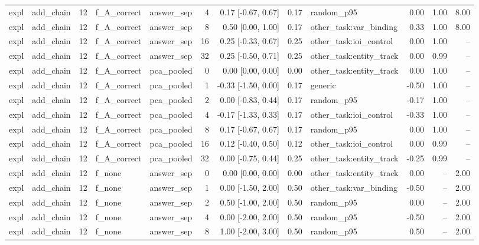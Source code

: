 \begin{tabular}{llrllrrrlrrr}
expl & add\_chain & 12 & f\_A\_correct & answer\_sep & 4 & 0.17 [-0.67, 0.67] & 0.17 & random\_p95 & 0.00 & 1.00 & 8.00 \\
expl & add\_chain & 12 & f\_A\_correct & answer\_sep & 8 & 0.50 [0.00, 1.00] & 0.17 & other\_task:var\_binding & 0.33 & 1.00 & 8.00 \\
expl & add\_chain & 12 & f\_A\_correct & answer\_sep & 16 & 0.25 [-0.33, 0.67] & 0.25 & other\_task:ioi\_control & 0.00 & 1.00 & -- \\
expl & add\_chain & 12 & f\_A\_correct & answer\_sep & 32 & 0.25 [-0.50, 0.71] & 0.25 & other\_task:entity\_track & 0.00 & 0.99 & -- \\
expl & add\_chain & 12 & f\_A\_correct & pca\_pooled & 0 & 0.00 [0.00, 0.00] & 0.00 & other\_task:entity\_track & 0.00 & 1.00 & -- \\
expl & add\_chain & 12 & f\_A\_correct & pca\_pooled & 1 & -0.33 [-1.50, 0.00] & 0.17 & generic & -0.50 & 1.00 & -- \\
expl & add\_chain & 12 & f\_A\_correct & pca\_pooled & 2 & 0.00 [-0.83, 0.44] & 0.17 & random\_p95 & -0.17 & 1.00 & -- \\
expl & add\_chain & 12 & f\_A\_correct & pca\_pooled & 4 & -0.17 [-1.33, 0.33] & 0.17 & other\_task:ioi\_control & -0.33 & 1.00 & -- \\
expl & add\_chain & 12 & f\_A\_correct & pca\_pooled & 8 & 0.17 [-0.67, 0.67] & 0.17 & random\_p95 & 0.00 & 1.00 & -- \\
expl & add\_chain & 12 & f\_A\_correct & pca\_pooled & 16 & 0.12 [-0.40, 0.50] & 0.12 & other\_task:ioi\_control & 0.00 & 0.99 & -- \\
expl & add\_chain & 12 & f\_A\_correct & pca\_pooled & 32 & 0.00 [-0.75, 0.44] & 0.25 & other\_task:entity\_track & -0.25 & 0.99 & -- \\
expl & add\_chain & 12 & f\_none & answer\_sep & 0 & 0.00 [0.00, 0.00] & 0.00 & other\_task:entity\_track & 0.00 & -- & 2.00 \\
expl & add\_chain & 12 & f\_none & answer\_sep & 1 & 0.00 [-1.50, 2.00] & 0.50 & other\_task:var\_binding & -0.50 & -- & 2.00 \\
expl & add\_chain & 12 & f\_none & answer\_sep & 2 & 0.50 [-1.00, 2.00] & 0.50 & random\_p95 & 0.00 & -- & 2.00 \\
expl & add\_chain & 12 & f\_none & answer\_sep & 4 & 0.00 [-2.00, 2.00] & 0.50 & random\_p95 & -0.50 & -- & 2.00 \\
expl & add\_chain & 12 & f\_none & answer\_sep & 8 & 1.00 [-2.00, 3.00] & 0.50 & random\_p95 & 0.50 & -- & 2.00 \\

\end{tabular}
